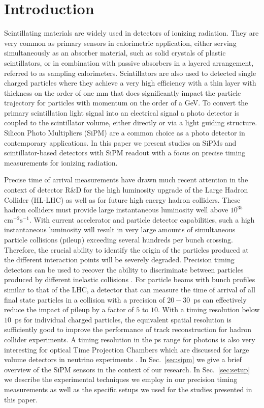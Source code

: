 \section{Introduction}
\label{sec:introduction}

Scintillating materials are widely used in detectors of ionizing radiation. They
are very common as primary sensors in calorimetric application, either serving
simultaneously as an absorber material, such as solid crystals of plastic
scintillators, or in combination with passive absorbers in a layered
arrangement, referred to as sampling calorimeters. Scintillators are also used
to detected single charged particles where they achieve a very high efficiency
with a thin layer with thickness on the order of one mm that does significantly
impact the particle trajectory for particles with momentum on the order of a GeV. To
convert the primary scintillation light signal into an electrical signal a photo
detector is coupled to the scintillator volume, either directly or via a light
guiding structure. Silicon Photo Multipliers (SiPM) are a common choice as a
photo detector in contemporary applications. In this paper we present studies on
SiPMs and scintillator-based detectors with SiPM readout with a focus on precise
timing measurements for ionizing radiation. 

Precise time of arrival measurements have drawn much recent attention in the 
context of detector R\&D for the high luminosity upgrade of the Large Hadron 
Collider (HL-LHC) as well as for future high energy hadron colliders.  
These hadron colliders must provide large 
instantaneous luminosity well above $10^{35}$~$\mathrm{cm}^{-2}\mathrm{s}^{-1}$.
With current accelerator and particle detector capabilities, such a high 
instantaneous luminosity will result in very large amounts
of simultaneous particle collisions (pileup) exceeding several hundreds per
bunch crossing. Therefore, the crucial ability to identify the origin 
of the particles produced at the different interaction points will be severely 
degraded. Precision timing detectors can be used to recover the ability to 
discriminate between particles produced by different inelastic collisions \cite{adielba}.
For particle beams with bunch profiles similar to that of the LHC, a detector 
that can measure the time of arrival of all final state particles in a collision
with a precision of $20-30$~ps can effectively reduce the impact of
pileup by a factor of $5$ to $10$. 
%
% 
% 
With a timing resolution below $10$~ps for individual charged particles, the
equivalent spatial resolution is sufficiently good to improve the performance of
track reconstruction \cite{4dtracking} for hadron collider experiments. A timing
resolution in the ps range for photons is also very interesting for optical Time
Projection Chambers which are discussed for large volume detectors in neutrino
experiments \cite{lappd, otpc}. 
%
%
%
In Sec.~\ref{sec:sipm} we give a brief overview of the SiPM sensors in the
context of our research. In Sec.~\ref{sec:setup} we describe the experimental
techniques we employ in our precision timing measurements as well as the
specific setups we used for the studies presented in this paper. 

